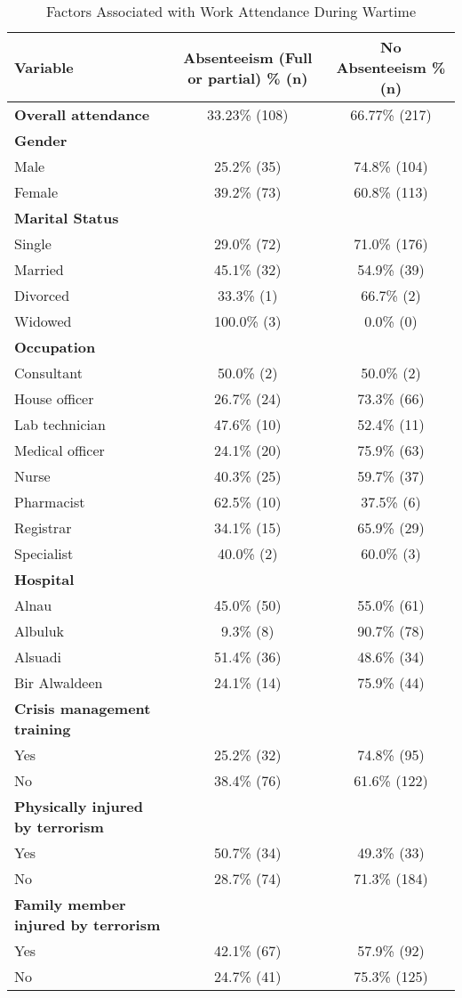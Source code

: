 \documentclass[12pt]{article}
\begin{document}
\begin{table}[h!]
\centering
\caption{Factors Associated with Work Attendance During Wartime}
\label{tab:attendance}
\small
\begin{tabular}{l c c}
\toprule
\textbf{Variable} & \textbf{Absenteeism (Full or partial) \% (n)} & \textbf{No Absenteeism \% (n)} \\
\midrule
\textbf{Overall attendance} & 33.23\% (108) & 66.77\% (217) \\
\midrule
\textbf{Gender} & & \\
\quad Male & 25.2\% (35) & 74.8\% (104) \\
\quad Female & 39.2\% (73) & 60.8\% (113) \\
\midrule
\textbf{Marital Status} & & \\
\quad Single & 29.0\% (72) & 71.0\% (176) \\
\quad Married & 45.1\% (32) & 54.9\% (39) \\
\quad Divorced & 33.3\% (1) & 66.7\% (2) \\
\quad Widowed & 100.0\% (3) & 0.0\% (0) \\
\midrule
\textbf{Occupation} & & \\
\quad Consultant & 50.0\% (2) & 50.0\% (2) \\
\quad House officer & 26.7\% (24) & 73.3\% (66) \\
\quad Lab technician & 47.6\% (10) & 52.4\% (11) \\
\quad Medical officer & 24.1\% (20) & 75.9\% (63) \\
\quad Nurse & 40.3\% (25) & 59.7\% (37) \\
\quad Pharmacist & 62.5\% (10) & 37.5\% (6) \\
\quad Registrar & 34.1\% (15) & 65.9\% (29) \\
\quad Specialist & 40.0\% (2) & 60.0\% (3) \\
\midrule
\textbf{Hospital} & & \\
\quad Alnau & 45.0\% (50) & 55.0\% (61) \\
\quad Albuluk & 9.3\% (8) & 90.7\% (78) \\
\quad Alsuadi & 51.4\% (36) & 48.6\% (34) \\
\quad Bir Alwaldeen & 24.1\% (14) & 75.9\% (44) \\
\midrule
\textbf{Crisis management training} & & \\
\quad Yes & 25.2\% (32) & 74.8\% (95) \\
\quad No & 38.4\% (76) & 61.6\% (122) \\
\midrule
\textbf{Physically injured by terrorism} & & \\
\quad Yes & 50.7\% (34) & 49.3\% (33) \\
\quad No & 28.7\% (74) & 71.3\% (184) \\
\midrule
\textbf{Family member injured by terrorism} & & \\
\quad Yes & 42.1\% (67) & 57.9\% (92) \\
\quad No & 24.7\% (41) & 75.3\% (125) \\
\bottomrule
\end{tabular}
\end{table}
\end{document}
